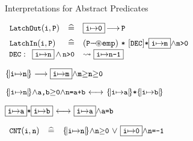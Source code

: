 \begin{frame}{Interpretations for Abstract Predicates}
\begin{small}
$
\begin{array}{lll}
\vspace{2mm}
 \LatchOut{i}{P} & \defs & \GLOBAL{i}{0} {\ourimply} \code{P}
\\
 \LatchIn{i}{P} &\defs &  (\code{P}{\septract}\emp) ~{\sep}~ [\DEC]  {\sep}\GLOBAL{i}{m} {\wedge}\code{m>0} 
 \\

\end{array}
$
$
\begin{array}{l}
\DEC: \begin{array}[t]{ll}
\GLOBAL{i}{n}\,{\wedge}\,\code{n{>}0} & \rightsquigarrow \GLOBAL{i}{n{-}1}
\end{array} \\
\end{array}
$
\end{small}
\pause
\vspace{2mm}
\begin{small}
$
\LOCAL{i}{n} \longrightarrow \GLOBALF{i}{m}{\code{m}{\geq}\code{n}{\geq}\code{0}}
$
\end{small}
\begin{small}
$
\LOCAL{i}{n}{\wedge}\code{a,b}{\geq}\code{0}{\wedge}{\code{n=a+b}}
~{\longleftrightarrow}~ \LOCAL{i}{a}{\sep}\LOCAL{i}{b} 
$
\end{small} 
\begin{small}
$
\GLOBAL{i}{a}{\sep}\GLOBAL{i}{b} 
~{\longleftrightarrow}~\GLOBAL{i}{a}{\wedge}\code{a{=}b}
$
\end{small}
\pause
\vspace{3mm}
\begin{small}
$
\begin{array}{lll}
\CNT{i}{n} &\defs & \LOCAL{i}{n} {\wedge}\code{n${\geq}$0}
~{\vee}~ \GLOBAL{i}{0}{\wedge}\code{n=-1} 
\end{array}
$
\end{small}

\end{frame}
